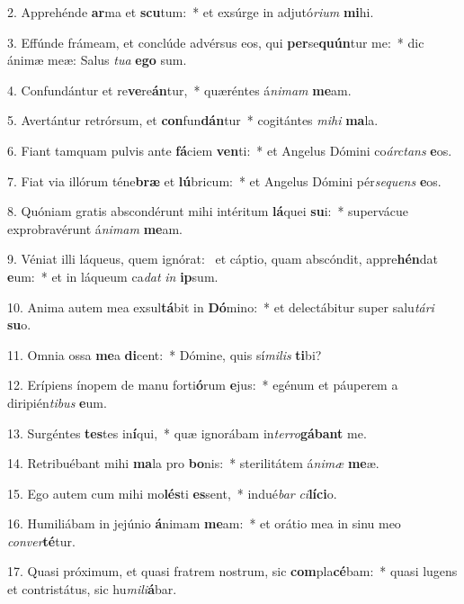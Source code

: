 2. Apprehénde \textbf{ar}ma et \textbf{scu}tum:~*  et exsúrge in adjutó\textit{ri}\textit{um} \textbf{mi}hi.\

3. Effúnde frámeam, et conclúde advérsus eos, qui \textbf{per}se\textbf{quún}tur me:~*  dic ánimæ meæ: Salus \textit{tu}\textit{a} \textbf{e}\textbf{go} sum.\

4. Confundántur et re\textbf{ve}re\textbf{án}tur,~*  quæréntes á\textit{ni}\textit{mam} \textbf{me}am.\

5. Avertántur retrórsum, et \textbf{con}fun\textbf{dán}tur~*  cogitántes \textit{mi}\textit{hi} \textbf{ma}la.\

6. Fiant tamquam pulvis ante \textbf{fá}ciem \textbf{ven}ti:~*  et Angelus Dómini co\textit{árc}\textit{tans} \textbf{e}os.\

7. Fiat via illórum téne\textbf{bræ} et \textbf{lú}bricum:~*  et Angelus Dómini pér\textit{se}\textit{quens} \textbf{e}os.\

8. Quóniam gratis abscondérunt mihi intéritum \textbf{lá}quei \textbf{su}i:~*  supervácue exprobravérunt á\textit{ni}\textit{mam} \textbf{me}am.\

9. Véniat illi láqueus, quem ignórat: \dag\  et cáptio, quam abscóndit, appre\textbf{hén}dat \textbf{e}um:~*  et in láqueum ca\textit{dat} \textit{in} \textbf{ip}sum.\

10. Anima autem mea exsul\textbf{tá}bit in \textbf{Dó}mino:~*  et delectábitur super salu\textit{tá}\textit{ri} \textbf{su}o.\

11. Omnia ossa \textbf{me}a \textbf{di}cent:~*  Dómine, quis sí\textit{mi}\textit{lis} \textbf{ti}bi?\

12. Erípiens ínopem de manu forti\textbf{ó}rum \textbf{e}jus:~*  egénum et páuperem a diripién\textit{ti}\textit{bus} \textbf{e}um.\

13. Surgéntes \textbf{tes}tes in\textbf{í}qui,~*  quæ ignorábam in\textit{ter}\textit{ro}\textbf{gá}\textbf{bant} me.\

14. Retribuébant mihi \textbf{ma}la pro \textbf{bo}nis:~*  sterilitátem á\textit{ni}\textit{mæ} \textbf{me}æ.\

15. Ego autem cum mihi mo\textbf{lés}ti \textbf{es}sent,~*  indué\textit{bar} \textit{ci}\textbf{lí}\textbf{ci}o.\

16. Humiliábam in jejúnio \textbf{á}nimam \textbf{me}am:~*  et orátio mea in sinu meo \textit{con}\textit{ver}\textbf{té}tur.\

17. Quasi próximum, et quasi fratrem nostrum, sic \textbf{com}pla\textbf{cé}bam:~*  quasi lugens et contristátus, sic hu\textit{mi}\textit{li}\textbf{á}bar.\

